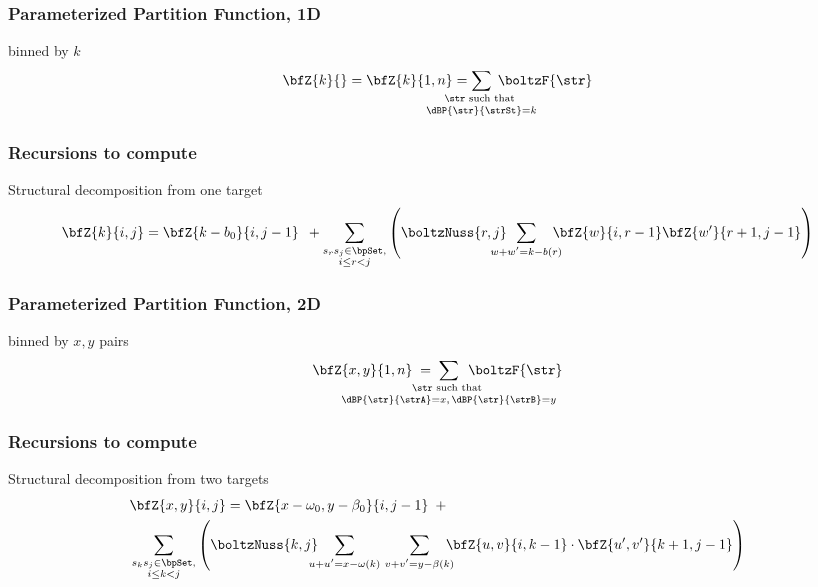 \documentclass{beamer}
\begin{document}
\begin{frame}
  \frametitle{Parameterized Partition Function, 1D}
  \begin{block}{\bfZ{}{} binned by $k$}
  \begin{align*}
  \bfZ{k}{} = \bfZ{k}{1,n} =
  \sum_{\mathclap{\substack{\str \text{ such that }\rule[-.5ex]{0pt}{0pt} \\ \dBP{\str}{\strSt}=k}}}\;
  \boltzF{\str}
  \end{align*}
  \end{block}
\end{frame}

\begin{frame}
  \frametitle{Recursions to compute }
  \begin{block}{Structural decomposition from one target}
  \begin{align*}
    \bfZ{k}{i,j} = \bfZ{k-b_0}{i,j-1}\enspace +
  \sum_{\substack{s_r s_j \in \bpSet, \\ i \le r<j}}
  \left(
  \boltzNuss{r,j}\enspace \sum_{\mathclap{w+w'=k-b(r)}}\quad
  \bfZ{w}{i,r-1} \bfZ{w'}{r+1,j-1}
  \right)
  \end{align*}
  \end{block}
\end{frame}

\begin{frame}
  \frametitle{Parameterized Partition Function, 2D}
  \begin{block}{\bfZ{}{} binned by $x,y$ pairs}
  \begin{align*}
  \bfZ{x,y}{1,n}\;=\;
  \sum_{\mathclap{\substack{
  \str \text{ such that } \rule[-.5ex]{0pt}{0pt} \\
  \dBP{\str}{\strA} = x,\,\dBP{\str}{\strB} = y}}}\enspace
  \boltzF{\str}
  \end{align*}
  \end{block}
\end{frame}

\begin{frame}
  \frametitle{Recursions to compute }
  \begin{block}{Structural decomposition from two targets}
  \begin{align*}
    \begin{split}
  & \bfZ{x,y}{i,j} = \bfZ{x- \omega_0,y-\beta_0}{i,j-1}\enspace + \\
  & \sum_{\substack{s_k s_j \in \bpSet, \\ i \le k<j}}
  \left(
  \boltzNuss{k,j}\quad
  \sum_{\mathclap{u+u'=x- \omega(k)}}\hspace{3.75em}
  \sum_{\mathclap{v+v'=y-\beta(k)}}\quad
  \bfZ{u,v}{i,k-1} \cdot \bfZ{u',v'}{k+1,j-1}
  \right)
  \end{split}
  \end{align*}
  \end{block}
\end{frame}
\end{document}
